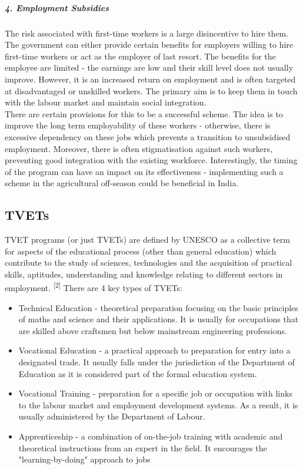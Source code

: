 \documentclass[a4paper, 10pt]{article}
\begin{document}
\subparagraph*{4. Employment Subsidies}
The risk associated with first-time workers is a large disincentive to hire them. The government can either provide certain benefits for employers willing to hire first-time workers or act as the employer of last resort. The benefits for the employee are limited - the earnings are low and their skill level does not usually improve. However, it is an increased return on employment and is often targeted at disadvantaged or unskilled workers. The primary aim is to keep them in touch with the labour market and maintain social integration. \\

\noindent There are certain provisions for this to be a successful scheme. The idea is to improve the long term employability of these workers - otherwise, there is excessive dependency on these jobs which prevents a transition to unsubsidised employment. Moreover, there is often stigmatisation against such workers, preventing good integration with the existing workforce. Interestingly, the timing of the program can have an impact on its effectiveness - implementing such a scheme in the agricultural off-season could be beneficial in India. 

\subsection*{TVETs}
TVET programs (or just TVETs) are defined by UNESCO as a collective term for aspects of the educational process (other than general education) which contribute to the study of sciences, technologies and the acquisition of practical skills, aptitudes, understanding and knowledge relating to different sectors in employment. \textsuperscript{[2]} There are 4 key types of TVETs:

\begin{itemize}
\item Technical Education - theoretical preparation focusing on the basic principles of maths and science and their applications. It is usually for occupations that are skilled above craftsmen but below mainstream engineering professions. 
\item Vocational Education - a practical approach to preparation for entry into a designated trade. It usually falls under the jurisdiction of the Department of Education as it is considered part of the formal education system.
\item Vocational Training - preparation for a specific job or occupation with links to the labour market and employment development systems. As a result, it is usually administered by the Department of Labour.
\item Apprenticeship - a combination of on-the-job training with academic and theoretical instructions from an expert in the field. It encourages the "learning-by-doing" approach to jobs
\end{itemize}
\end{document}
